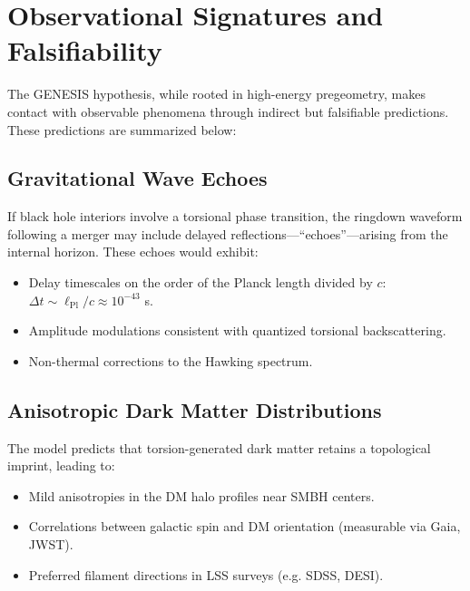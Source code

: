 \documentclass{article}
\begin{document}
\section{Observational Signatures and Falsifiability} \label{sec:observables} The GENESIS hypothesis, while rooted in high-energy pregeometry, makes contact with observable phenomena through indirect but falsifiable predictions. These predictions are summarized below:

\subsection{Gravitational Wave Echoes} If black hole interiors involve a torsional phase transition, the ringdown waveform following a merger may include delayed reflections---``echoes''---arising from the internal horizon. These echoes would exhibit: \begin{itemize} \item Delay timescales on the order of the Planck length divided by $c$: $\Delta t \sim \ell_{\text{Pl}}/c \approx 10^{-43}$ s. \item Amplitude modulations consistent with quantized torsional backscattering. \item Non-thermal corrections to the Hawking spectrum. \end{itemize}

\medskip
\begin{center}
\end{center}
\medskip


\subsection{Anisotropic Dark Matter Distributions} The model predicts that torsion-generated dark matter retains a topological imprint, leading to: \begin{itemize} \item Mild anisotropies in the DM halo profiles near SMBH centers. \item Correlations between galactic spin and DM orientation (measurable via Gaia, JWST). \item Preferred filament directions in LSS surveys (e.g. SDSS, DESI). \end{itemize}
\end{document}
